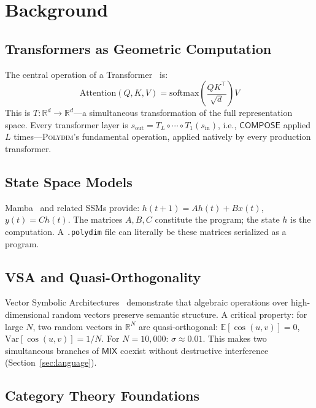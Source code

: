 \documentclass[10pt,twocolumn]{article}
\theoremstyle{plain}
\theoremstyle{definition}
\theoremstyle{remark}
\newcommand{\RR}{\mathbb{R}}
\newcommand{\Compose}{\mathsf{COMPOSE}}
\newcommand{\Mix}{\mathsf{MIX}}
\begin{document}
\section{Background}
\label{sec:background}

\subsection{Transformers as Geometric Computation}

The central operation of a Transformer~\citep{vaswani2017} is:
\[
  \mathrm{Attention}(Q, K, V)
  = \mathrm{softmax}\!\left(\frac{QK^\top}{\sqrt{d}}\right) V
\]
This is $T\colon \RR^d \to \RR^d$---a simultaneous transformation of the full
representation space. Every transformer layer is $s_{\mathrm{out}} = T_L \circ
\cdots \circ T_1(s_{\mathrm{in}})$, i.e., $\Compose$ applied $L$
times---\textsc{Polydim}'s fundamental operation, applied natively by every
production transformer.

\subsection{State Space Models}

Mamba~\citep{gu2023mamba} and related SSMs provide:
$h(t+1) = Ah(t) + Bx(t)$, $y(t) = Ch(t)$. The matrices $A, B, C$ constitute
the program; the state $h$ is the computation. A \texttt{.polydim} file can
literally be these matrices serialized as a program.

\subsection{VSA and Quasi-Orthogonality}

Vector Symbolic Architectures~\citep{plate1995,kanerva2009} demonstrate that
algebraic operations over high-dimensional random vectors preserve semantic
structure. A critical property: for large $N$, two random vectors in $\RR^N$
are quasi-orthogonal: $\mathbb{E}[\cos(u,v)] = 0$, $\mathrm{Var}[\cos(u,v)] =
1/N$. For $N = 10{,}000$: $\sigma \approx 0.01$. This makes two simultaneous
branches of $\Mix$ coexist without destructive interference
(Section~\ref{sec:language}).

\subsection{Category Theory Foundations}
\end{document}
